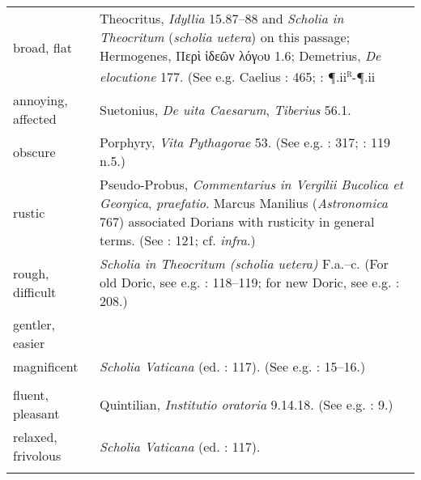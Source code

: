 \begin{longtable}{>{\raggedright\arraybackslash}p{3cm}>{\raggedright\arraybackslash}p{\textwidth - 3\tabcolsep - 3cm}}
 broad, flat & Theocritus, \textit{Idyllia} 15.87–88 and \textit{Scholia in Theocritum} (\textit{scholia uetera}) on this passage; Hermogenes, Περὶ ἰδεῶν λόγoυ 1.6; Demetrius, \textit{De elocutione} 177. (See e.g. Caelius \citealt{Caelius1542}: 465; \citealt{Estienne1573}: ¶.ii\textsc{\textsuperscript{r}}-¶.ii{\textsc{\textsuperscript{v}}; \citealt{Saumaise1643a}: 77.)\\
 annoying, affected & Suetonius, \textit{De uita Caesarum}, \textit{Tiberius} 56.1.\\
 obscure & Porphyry, \textit{Vita Pythagorae} 53. (See e.g. \citealt{Bentley1699}: 317; \citealt{Mazzocchi1754}: 119 n.5.)\\
 rustic & Pseudo-Probus, \textit{Commentarius in Vergilii Bucolica et Georgica}, \textit{praefatio}. Marcus Manilius (\textit{Astronomica} 767) associated Dorians with rusticity in general terms. (See \citealt{Rapin1659}: 121; cf. \textit{infra}.)\\ rough, difficult & \textit{Scholia in Theocritum (scholia uetera)} F.a.–c. (For old Doric, see e.g. \citealt{Mazzocchi1754}: 118–119; for new Doric, see e.g. \citealt{Valckenaer1773}: 208.)\\ gentler, easier & \\
 magnificent & \textit{Scholia Vaticana} (ed. \citealt{Hilgard1901}: 117). (See e.g. \citealt{Estienne1581}: 15–16.)\\\midrule\multicolumn{2}{c}{Ionic}\\\midrule 
fluent, pleasant & Quintilian, \textit{Institutio oratoria} 9.14.18. (See e.g. \citealt{Munthe1748}: 9.)\\
 relaxed, frivolous & \textit{Scholia Vaticana} (ed. \citealt{Hilgard1901}: 117).\\
}
\end{longtable}
